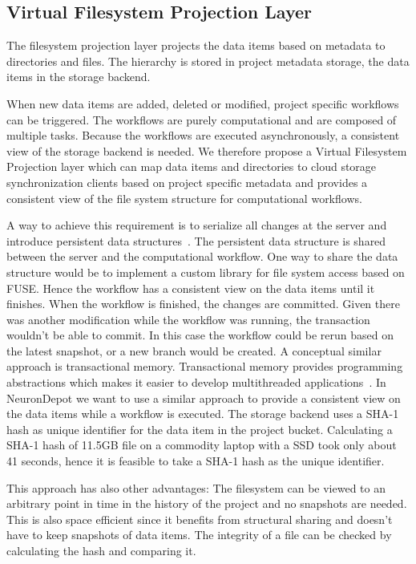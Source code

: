 \documentclass{frontiersSCNS} %
\begin{document}
\subsection{Virtual Filesystem Projection Layer}
The filesystem projection layer projects the data items based on metadata to
directories and files. The hierarchy is stored in project metadata storage, the
data items in the storage backend.

When new data items are added, deleted or modified, project specific workflows
can be triggered.  The workflows are purely computational and are composed of
multiple tasks. Because the workflows are executed asynchronously, a consistent
view of the storage backend is needed. We therefore propose a Virtual
Filesystem Projection layer which can map data items and directories to cloud
storage synchronization clients based on project specific metadata and provides
a consistent view of the file system structure for computational workflows.

A way to achieve this requirement is to serialize all changes at the server and
introduce persistent data structures~\cite{Driscoll1989}. The persistent data
structure is shared between the server and the computational workflow. One way
to share the data structure would be to implement a custom library for file
system access based on FUSE.  Hence the workflow has a consistent view on the
data items until it finishes. When the workflow is finished, the changes are
committed. Given there was another modification while the workflow was running,
the transaction wouldn’t be able to commit. In this case the workflow could be
rerun based on the latest snapshot, or a new branch would be created. A
conceptual similar approach is transactional memory. Transactional memory
provides programming abstractions which makes it easier to develop
multithreaded applications~\cite{Clojure}. In NeuronDepot we want to use a
similar approach to provide a consistent view on the data items while a
workflow is executed. The storage backend uses a SHA-1 hash as unique
identifier for the data item in the project bucket. Calculating a SHA-1 hash of
11.5GB file on a commodity laptop with a SSD took only about 41 seconds, hence
it is feasible to take a SHA-1 hash as the unique identifier.

This approach has also other advantages:  The filesystem can be viewed to an
arbitrary point in time in the history of the project and no snapshots are
needed. This is also space efficient since it benefits from structural sharing
and doesn’t have to keep snapshots of data items. The integrity of a file can
be checked by calculating the hash and comparing it.
\end{document}
